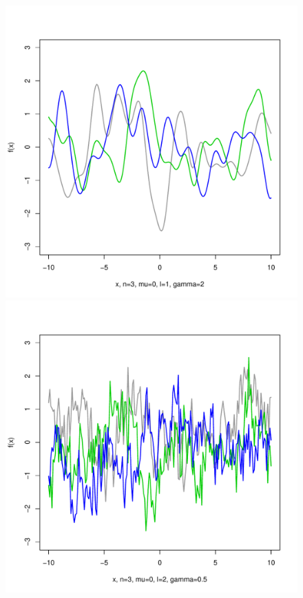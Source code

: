 \documentclass[12pt,letterpaper]{article}
\begin{document}
\begin{figure}
\begin{center}
\includegraphics[scale=0.2]{hw321/n3-m0-l1-g4.pdf}
\includegraphics[scale=0.2]{hw321/n3-m0-l2-g1.pdf}

\end{center}
\end{figure}
\end{document}
